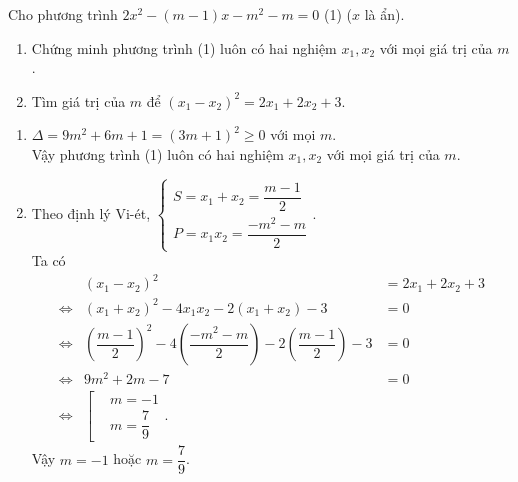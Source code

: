 \begin{ex}%
	Cho phương trình $2x^2-(m-1)x-m^2-m=0$ \quad (1) ($x$ là ẩn).
	\begin{enumerate}
		\item Chứng minh phương trình (1) luôn có hai nghiệm $x_1,x_2$ với mọi giá trị của $m$.
		\item Tìm giá trị của $m$ để $\left(x_1-x_2\right)^2=2x_1+2x_2+3$.
	\end{enumerate}
	\loigiai
	{
	\begin{enumerate}
		\item $\Delta=9m^2+6m+1=(3m+1)^2 \ge 0$ với mọi $m$.\\
		Vậy phương trình (1) luôn có hai nghiệm $x_1,x_2$ với mọi giá trị của $m$.
		
		\item Theo định lý Vi-ét, $\begin{cases}
		S=x_1+x_2=\dfrac{m-1}{2}\\
		P=x_1x_2=\dfrac{-m^2-m}{2}
		\end{cases}$.\\
		
		Ta có \begin{eqnarray*}
			&\left(x_1-x_2\right)^2&=2x_1+2x_2+3\\
			\Leftrightarrow&\left(x_1+x_2\right)^2-4x_1x_2-2\left(x_1+x_2\right)-3&=0\\
			\Leftrightarrow&\left(\dfrac{m-1}{2}\right)^2-4\left(\dfrac{-m^2-m}{2}\right)-2\left(\dfrac{m-1}{2}\right)-3&=0\\
			\Leftrightarrow&9m^2+2m-7&=0\\
			\Leftrightarrow&\left[\begin{aligned}
				&m=-1\\
				&m=\dfrac{7}{9}
			\end{aligned}\right..
		\end{eqnarray*}
	Vậy $m=-1$ hoặc $m=\dfrac{7}{9}$.
	\end{enumerate}}
\end{ex}
